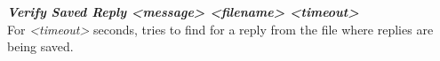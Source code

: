 \documentclass[english,12pt,a4paper,pdftex,elec,utf8]{aaltothesis}
\begin{document}
\textit{\textbf{Verify Saved Reply  <message> <filename> <timeout>}}\\
For \textit{<timeout>} seconds, tries to find for a reply from the file where replies are being saved.\\
\end{document}

